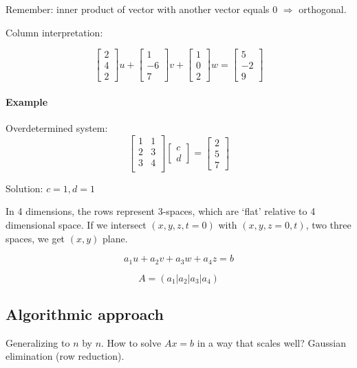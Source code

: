 \documentclass[12pt]{article}
\newcommand{\<}{\langle}
\renewcommand{\>}{\rangle}
\begin{document}
Remember: inner product of vector with another vector equals 0 $\Rightarrow$ orthogonal.

Column interpretation:

\[
	\begin{bmatrix}
		2 \\ 4 \\ 2
	\end{bmatrix} u + 
	\begin{bmatrix}
		1 \\ -6 \\ 7
	\end{bmatrix} v + 
	\begin{bmatrix}
		1 \\ 0 \\ 2
	\end{bmatrix} w =
	\begin{bmatrix}
		5 \\ -2 \\ 9
	\end{bmatrix}
\]

\paragraph{Example} Overdetermined system:
\[
	\begin{bmatrix}
		1 & 1 \\
		2 & 3 \\
		3 & 4 \\
	\end{bmatrix}
	\begin{bmatrix}
		c \\ d
	\end{bmatrix} = 
	\begin{bmatrix}
		2 \\ 5 \\ 7
	\end{bmatrix}
\]

Solution: $c = 1, d = 1$

In 4 dimensions, the rows represent 3-spaces, which are `flat' relative to 4 dimensional space. If we intersect $(x,y,z,t=0)$ with $(x,y,z=0,t)$, two three spaces, we get $(x,y)$ plane.

\[
	a_1 u + a_2 v + a_3 w + a_4 z = b
\]

\[
	A = (a_1 | a_2 | a_3 | a_4)
\]

\subsection{Algorithmic approach}
Generalizing to $n$ by $n$. How to solve $Ax = b$ in a way that scales well? Gaussian elimination (row reduction).
\end{document}
